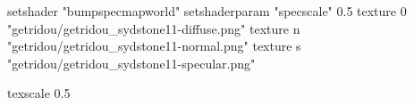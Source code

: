 setshader "bumpspecmapworld"
setshaderparam "specscale" 0.5
texture 0 "getridou/getridou_sydstone11-diffuse.png"
texture n "getridou/getridou_sydstone11-normal.png"
texture s "getridou/getridou_sydstone11-specular.png"

texscale 0.5